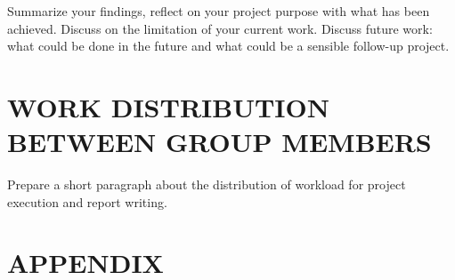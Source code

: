 \documentclass[a4paper,twoside]{article}
\begin{document}
Summarize your findings, reflect on your project purpose with what has been achieved. Discuss on the limitation of your current work. Discuss future work: what could be done in the future and what could be a sensible follow-up project.


\section*{\uppercase{Work distribution between group members}}

Prepare a short paragraph about the distribution of workload for project execution and report writing. 


{\small
}


\section*{\uppercase{Appendix}}
\end{document}
